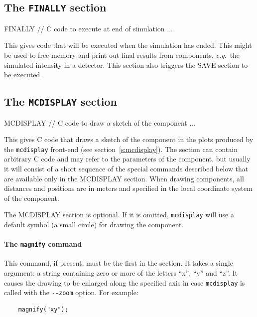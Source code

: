 \subsection{The \texttt{FINALLY} section}
\label{s:comp-finally}

\begin{mcstas}
FINALLY
// C code to execute at end of simulation ...
\end{mcstas}

This gives code that will be executed when the simulation has ended. This might
be used to free memory and print out final results from components,
\textit{e.g}.\ the simulated intensity in a detector. This section also triggers
the SAVE section to be executed.

\subsection{The \texttt{MCDISPLAY} section}
\label{s:comp-mcdisplay}

\begin{mcstas}
MCDISPLAY
// C code to draw a sketch of the component ...
\end{mcstas}

This gives C code that draws a sketch of the component in the plots
produced by the \verb+mcdisplay+ front-end (see
section~\ref{s:mcdisplay}). The section can contain arbitrary C code and
may refer to the parameters of the component, but usually it will
consist of a short sequence of the special commands described below that
are available only in the MCDISPLAY section.
When drawing components, all distances and positions are in meters and
specified in the local coordinate system of the component.

The MCDISPLAY section is optional. If it is omitted, \verb+mcdisplay+
will use a default symbol (a small circle) for drawing the component.

\paragraph{The {\tt magnify} command}

This command, if present, must be the first in the section. It takes a
single argument: a string containing zero or more of the letters ``x'',
``y'' and ``z''. It causes the drawing to be enlarged along the
specified axis in case \verb+mcdisplay+ is called with the \verb+--zoom+
option. For example:
\begin{lstlisting}
    magnify("xy");
\end{lstlisting}


